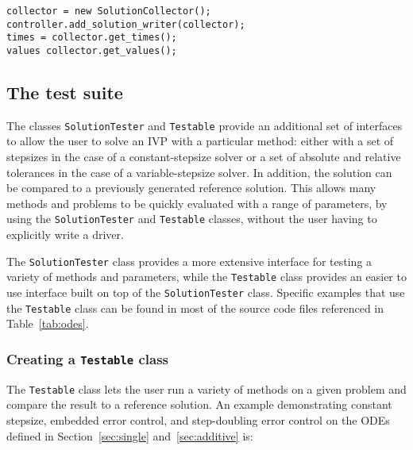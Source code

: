 \documentclass[10pt,letterpaper]{article}
\newcommand\tstble{{\tt Testable}}
\newcommand\stster{{\tt SolutionTester}}
\begin{document}
\begin{lstlisting}
collector = new SolutionCollector();
controller.add_solution_writer(collector);
times = collector.get_times();
values collector.get_values();
\end{lstlisting}

\subsection{The test suite}\label{sec:testsuite}

The classes \stster{} and \tstble{} provide an additional set of interfaces to
allow the user to solve an IVP with a particular method: either with a set of
stepsizes in the case of a constant-stepsize solver or a set of absolute and
relative tolerances in the case of a variable-stepsize solver. In addition, the
solution can be compared to a previously generated reference solution. This
allows many methods and problems to be quickly evaluated with a range of
parameters, by using the \stster{} and \tstble{} classes, without the user
having to explicitly write a driver.

The \stster{} class provides a more extensive interface for testing a variety of
methods and parameters, while the \tstble{} class provides an easier to use
interface built on top of the \stster{} class. Specific examples that use the
\tstble{} class can be found in most of the source code files referenced in
Table~\ref{tab:odes}.

\subsubsection{Creating a \tstble{} class}

The {\tt Testable} class lets the user run a variety of methods on a given
problem and compare the result to a reference solution. An example demonstrating
constant stepsize, embedded error control, and step-doubling error control on
the ODEs defined in Section~\ref{sec:single} and~\ref{sec:additive} is:
\end{document}
